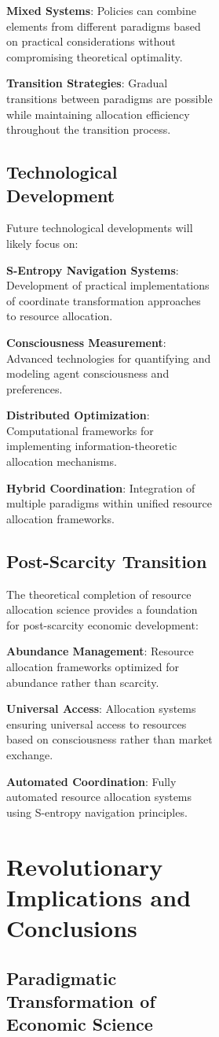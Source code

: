 \documentclass[12pt,a4paper]{article}
\begin{document}
\begin{figure}[H]
\begin{figure}[H]
\begin{figure}[H]
\textbf{Mixed Systems}: Policies can combine elements from different paradigms based on practical considerations without compromising theoretical optimality.

\textbf{Transition Strategies}: Gradual transitions between paradigms are possible while maintaining allocation efficiency throughout the transition process.

\subsection{Technological Development}

Future technological developments will likely focus on:

\textbf{S-Entropy Navigation Systems}: Development of practical implementations of coordinate transformation approaches to resource allocation.

\textbf{Consciousness Measurement}: Advanced technologies for quantifying and modeling agent consciousness and preferences.

\textbf{Distributed Optimization}: Computational frameworks for implementing information-theoretic allocation mechanisms.

\textbf{Hybrid Coordination}: Integration of multiple paradigms within unified resource allocation frameworks.

\subsection{Post-Scarcity Transition}

The theoretical completion of resource allocation science provides a foundation for post-scarcity economic development:

\textbf{Abundance Management}: Resource allocation frameworks optimized for abundance rather than scarcity.

\textbf{Universal Access}: Allocation systems ensuring universal access to resources based on consciousness rather than market exchange.

\textbf{Automated Coordination}: Fully automated resource allocation systems using S-entropy navigation principles.

\section{Revolutionary Implications and Conclusions}

\subsection{Paradigmatic Transformation of Economic Science}


\end{figure}
\end{figure}
\end{figure}
\end{document}
